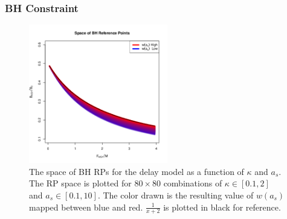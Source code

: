 %
\subsubsection{BH Constraint}

%
\begin{figure} %
\vspace{-2.75cm}
\includegraphics[width=0.54\textwidth]{../ddBias/rpSpaceww.png}
\vspace{-1.5cm}
\caption{
The space of BH RPs for the delay model as a function of $\kappa$ and $a_s$.
The RP space is plotted for $80\times80$ combinations of $\kappa\in[0.1, 2]$
and $a_s\in[0.1, 10]$. The color drawn is the resulting value of $w(a_s)$
mapped between blue and red.
$\frac{1}{x+2}$ is plotted in black for reference.
%
}
\label{rpSpace}
\end{figure}

